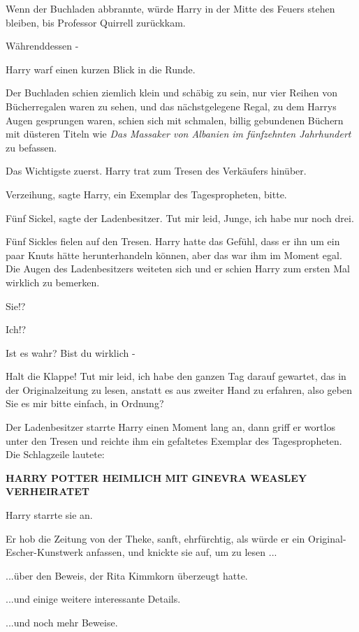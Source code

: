 Wenn der Buchladen abbrannte, würde Harry in der Mitte des Feuers stehen
bleiben, bis Professor Quirrell zurückkam.

Währenddessen -

Harry warf einen kurzen Blick in die Runde.

Der Buchladen schien ziemlich klein und schäbig zu sein, nur vier Reihen von
Bücherregalen waren zu sehen, und das nächstgelegene Regal, zu dem Harrys Augen
gesprungen waren, schien sich mit schmalen, billig gebundenen Büchern mit
düsteren Titeln wie \emph{Das Massaker von Albanien im fünfzehnten Jahrhundert}
zu befassen.

Das Wichtigste zuerst. Harry trat zum Tresen des Verkäufers hinüber.

\glqq{}Verzeihung\grqq{}, sagte Harry, \glqq{}ein Exemplar des Tagespropheten,
bitte.\grqq{}

\glqq{}Fünf Sickel\grqq{}, sagte der Ladenbesitzer. \glqq{}Tut mir leid, Junge,
ich habe nur noch drei.\grqq{}

Fünf Sickles fielen auf den Tresen. Harry hatte das Gefühl, dass er ihn um ein
paar Knuts hätte herunterhandeln können, aber das war ihm im Moment egal. Die
Augen des Ladenbesitzers weiteten sich und er schien Harry zum ersten Mal
wirklich zu bemerken.

\glqq{}Sie!?\grqq{}

\glqq{}Ich!?\grqq{}

\glqq{}Ist es wahr? Bist du wirklich -\grqq{}

\glqq{}Halt die Klappe! Tut mir leid, ich habe den ganzen Tag darauf gewartet,
das in der Originalzeitung zu lesen, anstatt es aus zweiter Hand zu erfahren,
also geben Sie es mir bitte einfach, in Ordnung?\grqq{}

Der Ladenbesitzer starrte Harry einen Moment lang an, dann griff er wortlos
unter den Tresen und reichte ihm ein gefaltetes Exemplar des Tagespropheten. Die
Schlagzeile lautete:

\textbf{HARRY POTTER HEIMLICH MIT GINEVRA WEASLEY VERHEIRATET}

Harry starrte sie an.

Er hob die Zeitung von der Theke, sanft, ehrfürchtig, als würde er ein
Original-Escher-Kunstwerk anfassen, und knickte sie auf, um zu lesen ...

...über den Beweis, der Rita Kimmkorn überzeugt hatte.

...und einige weitere interessante Details.

...und noch mehr Beweise.

